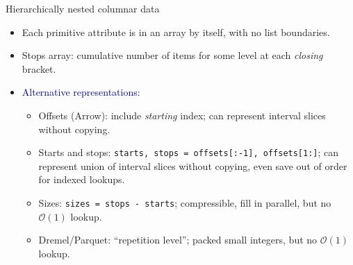 \documentclass[aspectratio=169]{beamer}
\begin{document}
\begin{frame}{Hierarchically nested columnar data}
\begin{itemize}
\item<3-> Each primitive attribute is in an array by itself, with no list boundaries.
\item<4-> Stops array: cumulative number of items for some level at each {\it closing} bracket.
\item<5-> \textcolor{darkblue}{Alternative representations:}
\begin{itemize}
\item<5-> Offsets (Arrow): include {\it starting} index; can represent interval slices without copying.
\item<6-> Starts and stops: {\tt\scriptsize starts, stops = offsets[:-1], offsets[1:]}; can represent union of interval slices without copying, even save out of order for indexed lookups.
\item<7-> Sizes: {\tt\scriptsize sizes = stops - starts}; compressible, fill in parallel, but no $\mathcal{O}(1)$ lookup.
\item<8-> Dremel/Parquet: ``repetition level''; packed small integers, but no $\mathcal{O}(1)$ lookup.
\end{itemize}
\end{itemize}
\end{frame}

\begin{frame}{}
\vspace{0.5 cm}

\end{frame}
\end{document}
